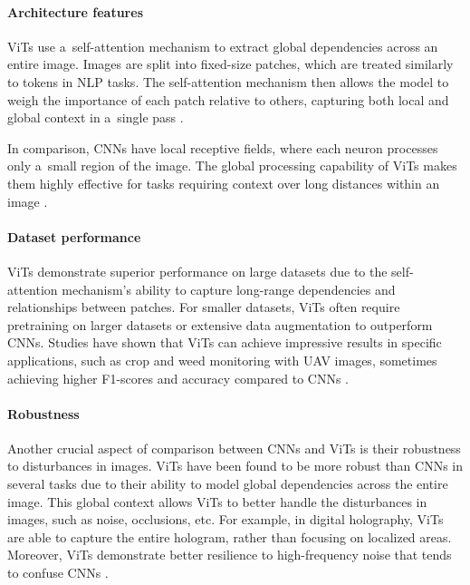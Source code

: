 \paragraph{Architecture features}

ViTs use a~self-attention mechanism to extract global dependencies across an entire image. Images are split into fixed-size patches, which are treated similarly to tokens in NLP tasks. The self-attention mechanism then allows the model to weigh the importance of each patch relative to others, capturing both local and global context in a~single pass \cite{Shah2024, app13095521}.

In comparison, CNNs have local receptive fields, where each neuron processes only a~small region of the image. The global processing capability of ViTs makes them highly effective for tasks requiring context over long distances within an image \cite{app13095521}.

\paragraph{Dataset performance}

ViTs demonstrate superior performance on large datasets due to the self-attention mechanism's ability to capture long-range dependencies and relationships between patches. For smaller datasets, ViTs often require pretraining on larger datasets or extensive data augmentation to outperform CNNs. Studies have shown that ViTs can achieve impressive results in specific applications, such as crop and weed monitoring with UAV images, sometimes achieving higher F1-scores and accuracy compared to CNNs \cite{app13095521}.

\paragraph{Robustness}

Another crucial aspect of comparison between CNNs and ViTs is their robustness to disturbances in images. ViTs have been found to be more robust than CNNs in several tasks due to their ability to model global dependencies across the entire image. This global context allows ViTs to better handle the disturbances in images, such as noise, occlusions, etc. For example, in digital holography, ViTs are able to capture the entire hologram, rather than focusing on localized areas. Moreover, ViTs demonstrate better resilience to high-frequency noise that tends to confuse CNNs \cite{shao2022adversarialrobustnessvisiontransformers, app13095521}.

